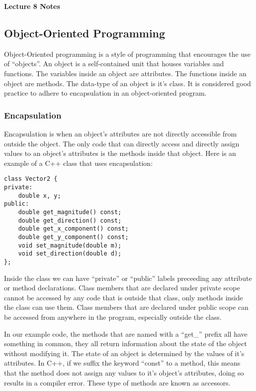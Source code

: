 \documentclass[a4paper,12pt]{article}
\begin{document}
\lstset{frame=single,tabsize=4,basicstyle=\ttfamily}

{\centering \bf \Large
Lecture 8 Notes \\[\baselineskip]
}

\subsection*{Object-Oriented Programming}

Object-Oriented programming is a style of programming that encourages the use of ``objects''. An object is a self-contained unit that houses variables and functions. The variables inside an object are attributes. The functions inside an object are methods. The data-type of an object is it's class. It is considered good practice to adhere to encapsulation in an object-oriented program. 

\subsubsection*{Encapsulation}

Encapsulation is when an object's attributes are not directly accessible from outside the object. The only code that can directly access and directly assign values to an object's attributes is the methods inside that object. Here is an example of a C++ class that uses encapsulation:

\begin{lstlisting}
class Vector2 {
private:
	double x, y;
public:
	double get_magnitude() const;
	double get_direction() const;
	double get_x_component() const;
	double get_y_component() const;
	void set_magnitude(double m);
	void set_direction(double d);
};
\end{lstlisting}

Inside the class we can have ``private'' or ``public'' labels preceeding any attribute or method declarations. Class members that are declared under private scope cannot be accessed by any code that is outside that class, only methods inside the class can use them. Class members that are declared under public scope can be accessed from anywhere in the program, especially outside the class.

In our example code, the methods that are named with a ``get\_'' prefix all have something in common, they all return information about the state of the object without modifying it. The state of an object is determined by the values of it's attributes. In C++, if we suffix the keyword ``const'' to a method, this means that the method does not assign any values to it's object's attributes, doing so results in a compiler error. These type of methods are known as accessors.
\end{document}
